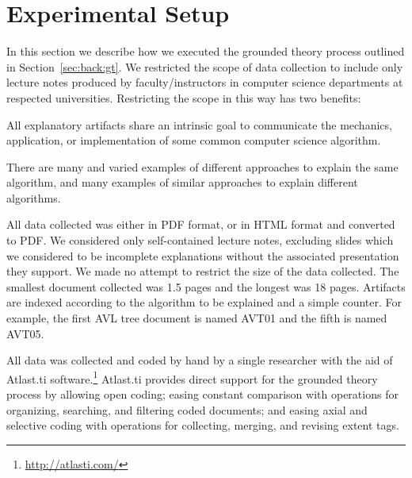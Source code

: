 \documentclass[sigconf]{acmart}
\begin{document}
%


\section{Experimental Setup}
\label{sec:exp:setup}

In this section we describe how we executed the grounded theory process
outlined in Section~\ref{sec:back:gt}.
%
We restricted the scope of data collection to include only lecture notes
produced by faculty/instructors in computer science departments at respected
universities. Restricting the scope in this way has two benefits:
%
\begin{enumerate*}
%
\item All explanatory artifacts share an intrinsic goal to communicate the
mechanics, application, or implementation of some common computer science
algorithm.
%
\item There are many and varied examples of different approaches to explain the
same algorithm, and many examples of similar approaches to explain different
algorithms.
%
\end{enumerate*}
%
All data collected was either in PDF format, or in HTML format and converted to
PDF. We considered only self-contained lecture notes, excluding slides which we
considered to be incomplete explanations without the associated presentation
they support.
%
We made no attempt to restrict the size of the data collected. The smallest
document collected was 1.5 pages and the longest was 18 pages.
%
Artifacts are indexed according to the algorithm to be explained and a simple
counter. For example, the first AVL tree document is named AVT01 and the fifth
is named AVT05.


All data was collected and coded by hand by a single researcher with the aid of
Atlast.ti software.\footnote{\url{http://atlasti.com/}}
%
Atlast.ti provides direct support for the grounded theory process by allowing
open coding; easing constant comparison with operations for organizing,
searching, and filtering coded documents; and easing axial and selective coding
with operations for collecting, merging, and revising extent tags.
\end{document}

